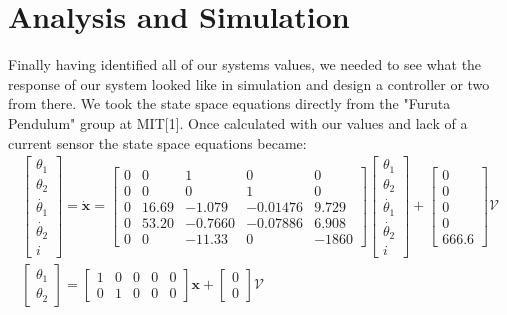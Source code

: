 \documentclass[12pt]{extarticle}
\newenvironment{sect}
  {\adjustwidth{-2.25em}{0pt}}
  {\endadjustwidth}
\begin{document}
\begin{sect}
\section{Analysis and Simulation}
Finally having identified all of our systems values, we needed to see what the response of our system looked like in simulation and design a controller or two from there. We took the state space equations directly from the "Furuta Pendulum" group at MIT[1]. Once calculated with our values and lack of a current sensor the state space equations became:
\[\begin{split}\begin{bmatrix}\theta_1\\\theta_2\\\dot{\theta_1}\\\dot{\theta_2}\\i\end{bmatrix}=\pmb{\dot{x}}=\begin{bmatrix}0 & 0 & 1 & 0 & 0\\0 & 0 &0 &1&0\\0&16.69&-1.079&-0.01476&9.729\\0&53.20&-0.7660&-0.07886&6.908\\0&0&-11.33&0&-1860\end{bmatrix}\begin{bmatrix}\theta_1\\\theta_2\\\dot{\theta_1}\\\dot{\theta_2}\\i\end{bmatrix}+\begin{bmatrix}0\\0\\0\\0\\666.6\end{bmatrix}\pmb{\mathcal{V}}\\\begin{bmatrix}\theta_1\\\theta_2\end{bmatrix}=\begin{bmatrix}1&0&0&0&0\\0&1&0&0&0\end{bmatrix}\pmb{x}+\begin{bmatrix}0\\0\end{bmatrix}\pmb{\mathcal{V}}\end{split}\]


\end{sect}
\end{document}
